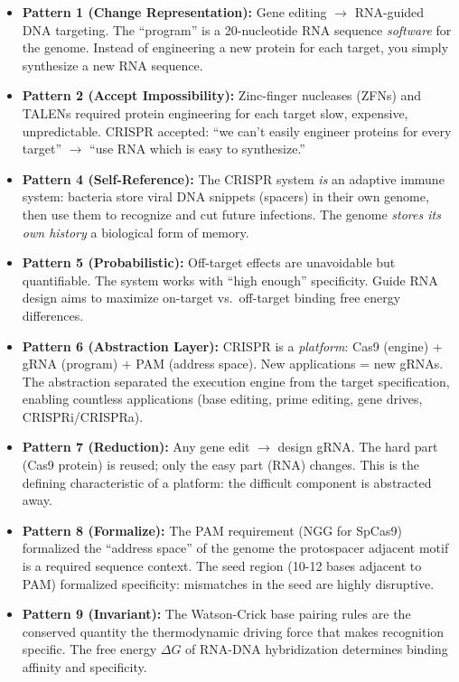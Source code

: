 \begin{itemize}
\item \textbf{Pattern 1 (Change Representation):} Gene editing $\to$ RNA-guided DNA targeting. The ``program'' is a 20-nucleotide RNA sequence \emph{software} for the genome. Instead of engineering a new protein for each target, you simply synthesize a new RNA sequence.

\item \textbf{Pattern 2 (Accept Impossibility):} Zinc-finger nucleases (ZFNs) and TALENs required protein engineering for each target slow, expensive, unpredictable. CRISPR accepted: ``we can't easily engineer proteins for every target'' $\to$ ``use RNA which is easy to synthesize.''

\item \textbf{Pattern 4 (Self-Reference):} The CRISPR system \emph{is} an adaptive immune system: bacteria store viral DNA snippets (spacers) in their own genome, then use them to recognize and cut future infections. The genome \emph{stores its own history} a biological form of memory.

\item \textbf{Pattern 5 (Probabilistic):} Off-target effects are unavoidable but quantifiable. The system works with ``high enough'' specificity. Guide RNA design aims to maximize on-target vs.\ off-target binding free energy differences.

\item \textbf{Pattern 6 (Abstraction Layer):} CRISPR is a \emph{platform}: Cas9 (engine) + gRNA (program) + PAM (address space). New applications = new gRNAs. The abstraction separated the execution engine from the target specification, enabling countless applications (base editing, prime editing, gene drives, CRISPRi/CRISPRa).

\item \textbf{Pattern 7 (Reduction):} Any gene edit $\to$ design gRNA. The hard part (Cas9 protein) is reused; only the easy part (RNA) changes. This is the defining characteristic of a platform: the difficult component is abstracted away.

\item \textbf{Pattern 8 (Formalize):} The PAM requirement (NGG for SpCas9) formalized the ``address space'' of the genome the protospacer adjacent motif is a required sequence context. The seed region (10-12 bases adjacent to PAM) formalized specificity: mismatches in the seed are highly disruptive.

\item \textbf{Pattern 9 (Invariant):} The Watson-Crick base pairing rules are the conserved quantity the thermodynamic driving force that makes recognition specific. The free energy $\Delta G$ of RNA-DNA hybridization determines binding affinity and specificity.
\end{itemize}

